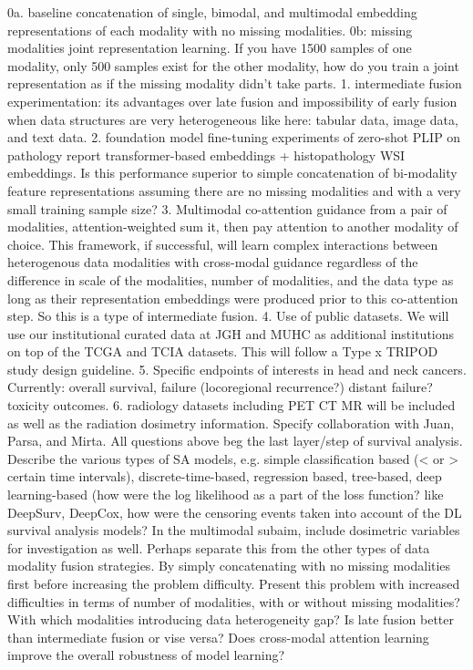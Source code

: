 \documentclass{article}%
\begin{document}
%
0a. baseline concatenation of single, bimodal, and multimodal embedding representations of each modality with no missing modalities. 0b: missing modalities joint representation learning. If you have 1500 samples of one modality, only 500 samples exist for the other modality, how do you train a joint representation as if the missing modality didn't take parts. 1. intermediate fusion experimentation: its advantages over late fusion and impossibility of early fusion when data structures are very heterogeneous like here: tabular data, image data, and text data. 2. foundation model fine{-}tuning experiments of zero{-}shot PLIP on pathology report transformer{-}based embeddings + histopathology WSI embeddings. Is this performance superior to simple concatenation of bi{-}modality feature representations assuming there are no missing modalities and with a very small training sample size? 3. Multimodal co{-}attention guidance from a pair of modalities, attention{-}weighted sum it, then pay attention to another modality of choice. This framework, if successful, will learn complex interactions between heterogenous data modalities with cross{-}modal guidance regardless of the difference in scale of the modalities, number of modalities, and the data type as long as their representation embeddings were produced prior to this co{-}attention step. So this is a type of intermediate fusion. 4. Use of public datasets. We will use our institutional curated data at JGH and MUHC as additional institutions on top of the TCGA and TCIA datasets. This will follow a Type x TRIPOD study design guideline. 5. Specific endpoints of interests in head and neck cancers. Currently: overall survival, failure (locoregional recurrence?) distant failure? toxicity outcomes. 6. radiology datasets including PET CT MR will be included as well as the radiation dosimetry information. Specify collaboration with Juan, Parsa, and Mirta. All questions above beg the last layer/step of survival analysis. Describe the various types of SA models, e.g. simple classification based (< or > certain time intervals), discrete{-}time{-}based, regression based, tree{-}based, deep learning{-}based (how were the log likelihood as a part of the loss function? like DeepSurv, DeepCox, how were the censoring events taken into account of the DL survival analysis models? %
\newline%
\newline%
%
In the multimodal subaim, include dosimetric variables for investigation as well. Perhaps separate this from the other types of data modality fusion strategies. By simply concatenating with no missing modalities first before increasing the problem difficulty. Present this problem with increased difficulties in terms of number of modalities, with or without missing modalities? With which modalities introducing data heterogeneity gap? Is late fusion better than intermediate fusion or vise versa? Does cross{-}modal attention learning improve the overall robustness of model learning? %
\end{document}
